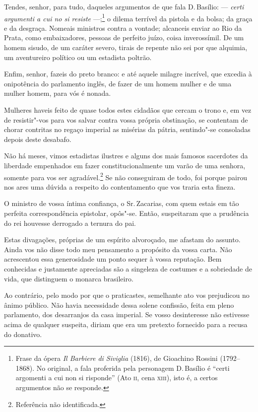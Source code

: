 \begin{linenumbers}
 Tendes, senhor, para tudo, daqueles argumentos de que fala D.\,Basílio:
--- \textit{certi argumenti a cui no si resiste} ---;\footnote{ Frase da ópera 
\textit{Il Barbiere di Siviglia} (1816), de Gioachino Rossini
(1792--1868). No original, a fala proferida pela personagem D.\,Basílio
é ``certi argomenti a cui non si risponde'' (Ato \textsc{ii}, cena \textsc{xiii}), isto é, a
certos argumentos não se responde.}
 o dilema terrível da pistola e da bolsa; da graça e da desgraça.
Nomeais ministros contra a vontade; alcanceis enviar ao Rio da Prata,
como embaixadores, pessoas de perfeito juízo, coisa inverossímil. De um
homem sisudo, de um caráter severo, tirais de repente não sei por que
alquimia, um aventureiro político ou um estadista poltrão. 

 Enfim, senhor, fazeis do preto branco: e até aquele milagre incrível,
que excedia à onipotência do parlamento inglês, de fazer de um homem
mulher e de uma mulher homem, para vós é nonada.

 Mulheres haveis feito de quase todos estes cidadãos que cercam o trono
e, em vez de resistir"-vos para vos salvar contra vossa própria
obstinação, se contentam de chorar contritas no regaço imperial as
misérias da pátria, sentindo"-se consoladas depois deste desabafo.

Não há meses, vimos estadistas ilustres e alguns dos mais famosos
sacerdotes da liberdade empenhados em fazer constitucionalmente um
varão de uma senhora, somente para vos ser
agradável.\footnote{ Referência não identificada.}
 Se não conseguiram de todo, foi porque pairou nos ares uma dúvida a
respeito do contentamento que vos traria esta fineza. 

 O ministro de vossa íntima confiança, o Sr.\,Zacarias, com quem estais
em tão perfeita correspondência epistolar, opôs"-se. Então,
suspeitaram que a prudência do rei houvesse derrogado a ternura do pai.


 Estas divagações, próprias de um espírito alvoroçado, me afastam do
assunto. Ainda vos não disse todo meu pensamento a propósito da vossa
carta. Não acrescentou essa generosidade um ponto sequer à vossa
reputação. Bem conhecidas e justamente apreciadas são a singeleza de
costumes e a sobriedade de vida, que distinguem o monarca brasileiro.

 Ao contrário, pelo modo por que o praticastes, semelhante ato vos
prejudicou no ânimo público. Não havia necessidade dessa solene
confissão, feita em pleno parlamento, dos desarranjos da casa imperial.
Se vosso desinteresse não estivesse acima de qualquer suspeita, diriam
que era um pretexto fornecido para a recusa do donativo. 


\end{linenumbers}
